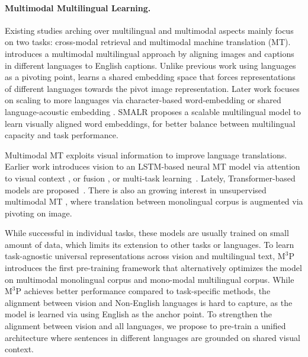 \documentclass[final]{cvpr}
\newcommand{\yu}[1]{\textcolor{green}{\small{\bf [Yu: #1 ]}}}
\begin{document}
\paragraph{Multimodal Multilingual Learning.} 
Existing studies arching over multilingual and multimodal aspects mainly focus on two tasks: cross-modal retrieval and multimodal machine translation (MT). %
\cite{rajendran-etal-2016-bridge, calixto-liu-2017-sentence} introduces a multimodal multilingual approach by aligning images and captions in  different languages to English captions. Unlike previous work using languages as a pivoting point, \cite{gella2017image} learns a shared embedding space that forces representations of different languages towards the pivot image representation. Later work focuses on scaling to more languages via character-based word-embedding \cite{S-LIWE} or shared language-acoustic embedding \cite{MULE}. SMALR \cite{SMALR} proposes a scalable multilingual model to learn visually aligned word embeddings, for better balance between multilingual capacity and task performance.

Multimodal MT exploits visual information to improve language translations. Earlier work introduces vision to an LSTM-based neural MT model via attention to visual context \cite{calixto-etal-2017-doubly, helcl-libovicky-2017-cuni}, or fusion \cite{calixto-liu-2017-incorporating}, or multi-task learning\ \cite{elliott-kadar-2017-imagination, zhou2018visual}. Lately, Transformer-based~\cite{NIPS2017_3f5ee243} models are proposed~\cite{DBLP:journals/corr/abs-1807-11605, yao-wan-2020-multimodal}. There is also an growing interest in unsupervised multimodal MT \cite{huang-etal-2020-unsupervised,Sigurdsson_2020_CVPR}, where translation between monolingual corpus is augmented via pivoting on image. 


While successful in individual tasks, these models are usually trained on small amount of data, which limits its extension to other tasks or languages. To learn task-agnostic universal representations across vision and multilingual text,  $\text{M}^3\text{P}$\cite{hu2020xtreme} introduces the first pre-training framework that alternatively optimizes the model on multimodal monolingual corpus and mono-modal multilingual corpus. While $\text{M}^3\text{P}$ achieves better performance compared to task-specific methods, the alignment between vision and Non-English languages is hard to capture, as the model is learned via using English as the anchor point. To strengthen the alignment between vision and all languages, we propose to pre-train a unified architecture where sentences in different languages are grounded on shared visual context. 
\end{document}
